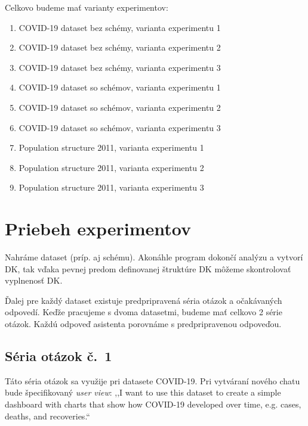 Celkovo budeme mať varianty experimentov:
\begin{enumerate}
\item COVID-19 dataset bez schémy, varianta experimentu 1
\item COVID-19 dataset bez schémy, varianta experimentu 2
\item COVID-19 dataset bez schémy, varianta experimentu 3
\item COVID-19 dataset so schémov, varianta experimentu 1
\item COVID-19 dataset so schémov, varianta experimentu 2
\item COVID-19 dataset so schémov, varianta experimentu 3
\item Population structure 2011, varianta experimentu 1
\item Population structure 2011, varianta experimentu 2
\item Population structure 2011, varianta experimentu 3
\end{enumerate}

\section{Priebeh experimentov}

Nahráme dataset (príp. aj schému). Akonáhle program dokončí analýzu a vytvorí DK, tak vďaka pevnej predom definovanej štruktúre DK môžeme skontrolovať vyplnenosť DK.

Ďalej pre každý dataset existuje predpripravená séria otázok a očakávaných odpovedí. Keďže pracujeme s dvoma datasetmi, budeme mať celkovo 2 série otázok. Každú odpoveď asistenta porovnáme s predpripravenou odpoveďou.

\subsection{Séria otázok č.~1}

Táto séria otázok sa využije pri datasete COVID-19. Pri vytváraní nového chatu bude špecifikovaný \textit{user view}: ,,I want to use this dataset to create a simple dashboard with charts that show how COVID-19 developed over time, e.g. cases, deaths, and recoveries.``

